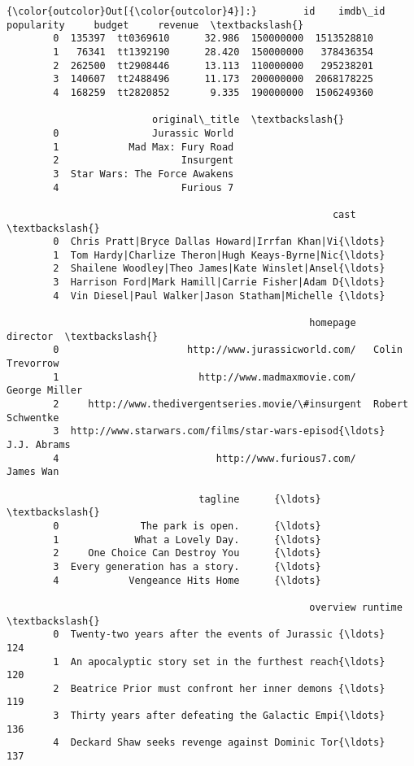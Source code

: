 \documentclass[11pt]{article}
\begin{document}
\begin{Verbatim}[commandchars=\\\{\}]
{\color{outcolor}Out[{\color{outcolor}4}]:}        id    imdb\_id  popularity     budget     revenue  \textbackslash{}
        0  135397  tt0369610      32.986  150000000  1513528810   
        1   76341  tt1392190      28.420  150000000   378436354   
        2  262500  tt2908446      13.113  110000000   295238201   
        3  140607  tt2488496      11.173  200000000  2068178225   
        4  168259  tt2820852       9.335  190000000  1506249360   
        
                         original\_title  \textbackslash{}
        0                Jurassic World   
        1            Mad Max: Fury Road   
        2                     Insurgent   
        3  Star Wars: The Force Awakens   
        4                     Furious 7   
        
                                                        cast  \textbackslash{}
        0  Chris Pratt|Bryce Dallas Howard|Irrfan Khan|Vi{\ldots}   
        1  Tom Hardy|Charlize Theron|Hugh Keays-Byrne|Nic{\ldots}   
        2  Shailene Woodley|Theo James|Kate Winslet|Ansel{\ldots}   
        3  Harrison Ford|Mark Hamill|Carrie Fisher|Adam D{\ldots}   
        4  Vin Diesel|Paul Walker|Jason Statham|Michelle {\ldots}   
        
                                                    homepage          director  \textbackslash{}
        0                      http://www.jurassicworld.com/   Colin Trevorrow   
        1                        http://www.madmaxmovie.com/     George Miller   
        2     http://www.thedivergentseries.movie/\#insurgent  Robert Schwentke   
        3  http://www.starwars.com/films/star-wars-episod{\ldots}       J.J. Abrams   
        4                           http://www.furious7.com/         James Wan   
        
                                 tagline      {\ldots}        \textbackslash{}
        0              The park is open.      {\ldots}         
        1             What a Lovely Day.      {\ldots}         
        2     One Choice Can Destroy You      {\ldots}         
        3  Every generation has a story.      {\ldots}         
        4            Vengeance Hits Home      {\ldots}         
        
                                                    overview runtime  \textbackslash{}
        0  Twenty-two years after the events of Jurassic {\ldots}     124   
        1  An apocalyptic story set in the furthest reach{\ldots}     120   
        2  Beatrice Prior must confront her inner demons {\ldots}     119   
        3  Thirty years after defeating the Galactic Empi{\ldots}     136   
        4  Deckard Shaw seeks revenge against Dominic Tor{\ldots}     137   
        

\end{Verbatim}
\end{document}

